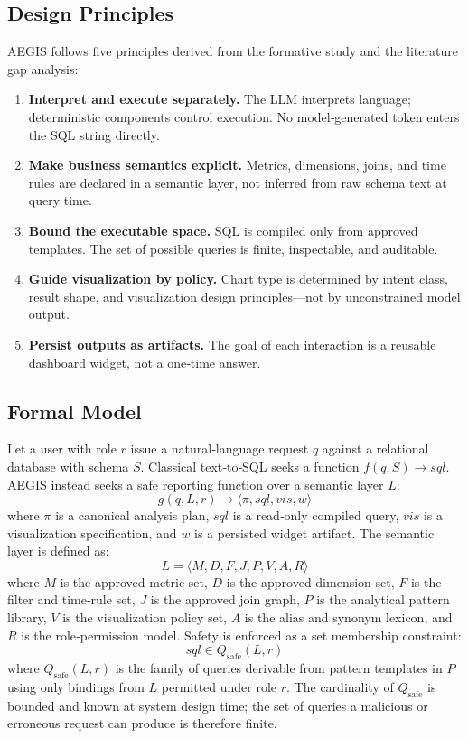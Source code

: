 \documentclass[11pt]{article}
\begin{document}
\subsection{Design Principles}
AEGIS follows five principles derived from the formative study and the literature gap analysis:
\begin{enumerate}
  \item \textbf{Interpret and execute separately.} The LLM interprets language; deterministic components control execution. No model‑generated token enters the SQL string directly.
  \item \textbf{Make business semantics explicit.} Metrics, dimensions, joins, and time rules are declared in a semantic layer, not inferred from raw schema text at query time.
  \item \textbf{Bound the executable space.} SQL is compiled only from approved templates. The set of possible queries is finite, inspectable, and auditable.
  \item \textbf{Guide visualization by policy.} Chart type is determined by intent class, result shape, and visualization design principles—not by unconstrained model output.
  \item \textbf{Persist outputs as artifacts.} The goal of each interaction is a reusable dashboard widget, not a one‑time answer.
\end{enumerate}

\subsection{Formal Model}
Let a user with role $r$ issue a natural‑language request $q$ against a relational database with schema $S$. Classical text‑to‑SQL seeks a function $f(q,S)\rightarrow sql$. AEGIS instead seeks a safe reporting function over a semantic layer $L$:
\begin{equation}
 g(q, L, r) \rightarrow \langle \pi, sql, vis, w \rangle
\end{equation}
where $\pi$ is a canonical analysis plan, $sql$ is a read‑only compiled query, $vis$ is a visualization specification, and $w$ is a persisted widget artifact. The semantic layer is defined as:
\begin{equation}
 L = \langle M, D, F, J, P, V, A, R \rangle
\end{equation}
where $M$ is the approved metric set, $D$ is the approved dimension set, $F$ is the filter and time‑rule set, $J$ is the approved join graph, $P$ is the analytical pattern library, $V$ is the visualization policy set, $A$ is the alias and synonym lexicon, and $R$ is the role‑permission model. Safety is enforced as a set membership constraint:
\begin{equation}
 sql \in Q_{\mathrm{safe}}(L,r)
\end{equation}
where $Q_{\mathrm{safe}}(L,r)$ is the family of queries derivable from pattern templates in $P$ using only bindings from $L$ permitted under role $r$. The cardinality of $Q_{\mathrm{safe}}$ is bounded and known at system design time; the set of queries a malicious or erroneous request can produce is therefore finite.
\end{document}
